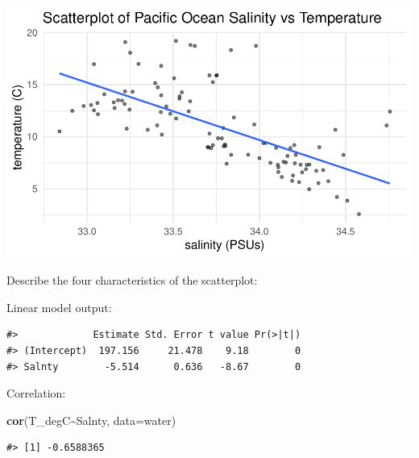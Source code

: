 \documentclass[
]{report}
\newenvironment{Shaded}{\begin{snugshade}}{\end{snugshade}}
\newcommand{\AttributeTok}[1]{\textcolor[rgb]{0.13,0.29,0.53}{#1}}
\newcommand{\CommentTok}[1]{\textcolor[rgb]{0.56,0.35,0.01}{\textit{#1}}}
\newcommand{\DecValTok}[1]{\textcolor[rgb]{0.00,0.00,0.81}{#1}}
\newcommand{\FunctionTok}[1]{\textcolor[rgb]{0.13,0.29,0.53}{\textbf{#1}}}
\newcommand{\NormalTok}[1]{#1}
\newcommand{\OtherTok}[1]{\textcolor[rgb]{0.56,0.35,0.01}{#1}}
\newcommand{\SpecialCharTok}[1]{\textcolor[rgb]{0.81,0.36,0.00}{\textbf{#1}}}
\begin{document}
\begin{center}\includegraphics[width=0.7\linewidth]{13-VN13-regression_files/figure-latex/unnamed-chunk-10-1} \end{center}

Describe the four characteristics of the scatterplot:

\vspace{1in}

Linear model output:

\begin{Shaded}
\end{Shaded}

\begin{verbatim}
#>             Estimate Std. Error t value Pr(>|t|)
#> (Intercept)  197.156     21.478    9.18        0
#> Salnty        -5.514      0.636   -8.67        0
\end{verbatim}

Correlation:

\begin{Shaded}
\begin{Highlighting}[]
\FunctionTok{cor}\NormalTok{(T\_degC}\SpecialCharTok{\textasciitilde{}}\NormalTok{Salnty, }\AttributeTok{data=}\NormalTok{water)}
\end{Highlighting}
\end{Shaded}

\begin{verbatim}
#> [1] -0.6588365
\end{verbatim}
\end{document}
